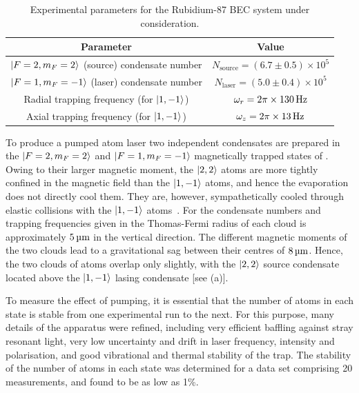 \begin{table}
    \centering
    \begin{tabular}{cc}
    \toprule
    Parameter & Value\\
    \midrule
    ${\left|F=2, m_F=2\right>}$ (source) condensate number & $N_\text{source} = (6.7 \pm 0.5)\times 10^5$ \\
    ${\left|F=1, m_F=-1\right>}$ (laser) condensate number & $N_\text{laser} = (5.0 \pm 0.4) \times 10^5$ \\
    Radial trapping frequency (for ${\left|1, -1\right>}$) & $\omega_r = \unit[2\pi \times 130]{Hz}$ \\
    Axial trapping frequency (for ${\left|1, -1\right>}$) & $\omega_z = \unit[2\pi \times 13]{Hz}$ \\
    \bottomrule
    \end{tabular}
    \caption{Experimental parameters for the Rubidium-87 BEC system under consideration.}
    \label{OpticalPumping:ExperimentalParameters}
\end{table}


To produce a pumped atom laser two independent condensates are prepared in the ${\left|F=2, m_F=2\right>}$ and ${\left|F=1, m_F=-1\right>}$ magnetically trapped states of .  Owing to their larger magnetic moment, the ${\left|2, 2\right>}$ atoms are more tightly confined in the magnetic field than the ${\left|1, -1\right>}$ atoms, and hence the evaporation does not directly cool them.  They are, however, sympathetically cooled through elastic collisions with the ${\left|1, -1\right>}$ atoms~\citep{Myatt:1997}.  For the condensate numbers and trapping frequencies given in  the Thomas-Fermi radius of each cloud is approximately $\unit[5]{\micro m}$ in the vertical direction.  The different magnetic moments of the two clouds lead to a gravitational sag between their centres of $\unit[8]{\micro m}$. Hence, the two clouds of atoms overlap only slightly, with the ${\left|2, 2\right>}$ source condensate located above the ${\left|1, -1\right>}$ lasing condensate [see (a)].

To measure the effect of pumping, it is essential that the number of atoms in each state is stable from one experimental run to the next.  For this purpose, many details of the apparatus were refined, including very efficient baffling against stray resonant light, very low uncertainty and drift in laser frequency, intensity and polarisation, and good vibrational and thermal stability of the trap.  The stability of the number of atoms in each state was determined for a data set comprising 20 measurements, and found to be as low as 1\%.

